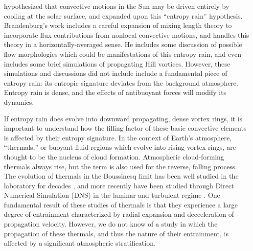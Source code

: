 \documentclass[twocolumn, amsmath, amsfonts, amssymb, trackchanges]{aastex62}
\begin{document}
\cite{spruit1997} hypothesized that convective motions in the Sun may be driven entirely by cooling at the solar surface, and \citet{brandenburg2016} expanded upon this ``entropy rain'' hypothesis. 
Brandenburg's work includes a careful expansion of mixing length theory to incorporate flux contributions from nonlocal convective motions, and handles this theory in a horizontally-averaged sense.
He includes some discussion of possible flow morphologies which could be manifestations of this entropy rain, and even includes some brief simulations of propagating Hill vortices. 
However, these simulations and discussions did not include include a fundamental piece of entropy rain: its entropic signature deviates from the background atmosphere.
Entropy rain is dense, and the effects of antibuoyant forces will modify its dynamics.

If entropy rain does evolve into downward propagating, dense vortex rings, it is important to understand how the filling factor of these basic convective elements is affected by their entropy signature. 
In the context of Earth's atmosphere, ``thermals,'' or buoyant fluid regions which evolve into rising vortex rings, are thought to be the nucleus of cloud formation. 
Atmospheric cloud-forming thermals always rise, but the term is also used for the reverse, falling process.
The evolution of thermals in the Boussinesq limit has been well studied in the laboratory for decades \citep[see e.g.][]{morton&all1956, scorer1957}, and more recently have been studied through Direct Numerical Simulation (DNS) in the laminar and turbulent regime \citep{lecoanet&jeevanjee2018}. 
One fundamental result of these studies of thermals is that they experience a large degree of entrainment characterized by radial expansion and decceleration of propagation velocity.
However, we do not know of a study in which the propagation of these thermals, and thus the nature of their entrainment, is affected by a significant atmospheric stratification.
\end{document}
